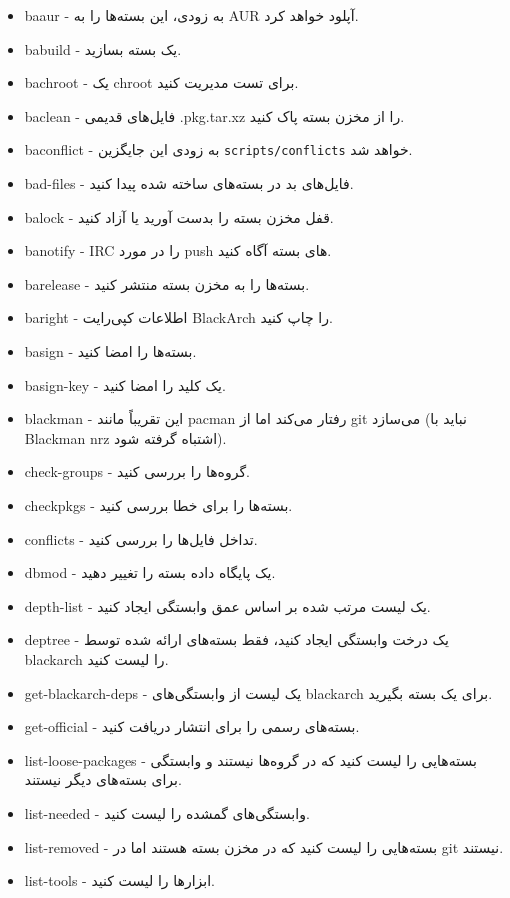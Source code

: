 \documentclass[a4paper, oneside, 11pt]{book}
\begin{document}
\begin{itemize}
\item baaur - به زودی، این بسته‌ها را به AUR آپلود خواهد کرد.
\item babuild - یک بسته بسازید.
\item bachroot - یک chroot برای تست مدیریت کنید.
\item baclean - فایل‌های قدیمی .pkg.tar.xz را از مخزن بسته پاک کنید.
\item baconflict - به زودی این جایگزین \verb|scripts/conflicts| خواهد شد.
\item bad-files - فایل‌های بد در بسته‌های ساخته شده پیدا کنید.
\item balock - قفل مخزن بسته را بدست آورید یا آزاد کنید.
\item banotify - IRC را در مورد push های بسته آگاه کنید.
\item barelease - بسته‌ها را به مخزن بسته منتشر کنید.
\item baright - اطلاعات کپی‌رایت BlackArch را چاپ کنید.
\item basign - بسته‌ها را امضا کنید.
\item basign-key - یک کلید را امضا کنید.
\item blackman - این تقریباً مانند pacman رفتار می‌کند اما از git می‌سازد (نباید با
    Blackman nrz اشتباه گرفته شود).
\item check-groups - گروه‌ها را بررسی کنید.
\item checkpkgs - بسته‌ها را برای خطا بررسی کنید.
\item conflicts - تداخل فایل‌ها را بررسی کنید.
\item dbmod - یک پایگاه داده بسته را تغییر دهید.
\item depth-list - یک لیست مرتب شده بر اساس عمق وابستگی ایجاد کنید.
\item deptree - یک درخت وابستگی ایجاد کنید، فقط بسته‌های ارائه شده توسط blackarch را لیست کنید.
\item get-blackarch-deps - یک لیست از وابستگی‌های blackarch برای یک بسته بگیرید.
\item get-official - بسته‌های رسمی را برای انتشار دریافت کنید.
\item list-loose-packages - بسته‌هایی را لیست کنید که در گروه‌ها نیستند و
    وابستگی برای بسته‌های دیگر نیستند.
\item list-needed - وابستگی‌های گمشده را لیست کنید.
\item list-removed - بسته‌هایی را لیست کنید که در مخزن بسته هستند اما در git نیستند.
\item list-tools - ابزارها را لیست کنید.

\end{itemize}
\end{document}
